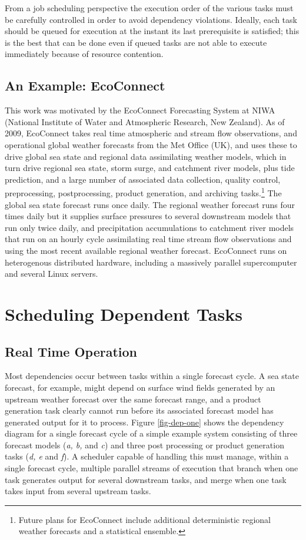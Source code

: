 \documentclass[11pt,a4paper]{article}
\begin{document}
From a job scheduling perspective the execution order of the various
tasks must be carefully controlled in order to avoid dependency
violations. Ideally, each task should be queued for execution at the
instant its last prerequisite is satisfied; this is the best that can be
done even if queued tasks are not able to execute immediately because of
resource contention.


\subsection{An Example: EcoConnect}

This work was motivated by the EcoConnect Forecasting System at NIWA
(National Institute of Water and Atmospheric Research, New Zealand). As
of 2009, EcoConnect takes real time atmospheric and stream flow
observations, and operational global weather forecasts from the Met
Office (UK), and uses these to drive global sea state and regional data
assimilating weather models, which in turn drive regional sea state,
storm surge, and catchment river models, plus tide prediction, and a
large number of associated data collection, quality control,
preprocessing, postprocessing, product generation, and archiving
tasks.\footnote{Future plans for EcoConnect include additional
deterministic regional weather forecasts and a statistical ensemble.}
The global sea state forecast runs once daily.  The regional weather
forecast runs four times daily but it supplies surface pressures to
several downstream models that run only twice daily, and precipitation
accumulations to catchment river models that run on an hourly cycle
assimilating real time stream flow observations and using the most
recent available regional weather forecast.  EcoConnect runs on
heterogenous distributed hardware, including a massively parallel
supercomputer and several Linux servers. 

\pagebreak
\section{Scheduling Dependent Tasks }

\subsection{Real Time Operation}

Most dependencies occur between tasks within a single forecast cycle. A
sea state forecast, for example, might depend on surface wind fields
generated by an upstream weather forecast over the same forecast range,
and a product generation task clearly cannot run before its associated
forecast model has generated output for it to process. Figure
\ref{fig-dep-one} shows the dependency diagram for a single forecast
cycle of a simple example system consisting of three forecast models
({\em a, b,} and {\em c}) and three post processing or product
generation tasks ({\em d, e} and {\em f}).  A scheduler capable
of handling this must manage, within a single forecast cycle, multiple
parallel streams of execution that branch when one task generates output
for several downstream tasks, and merge when one task takes input from
several upstream tasks. 
\end{document}
